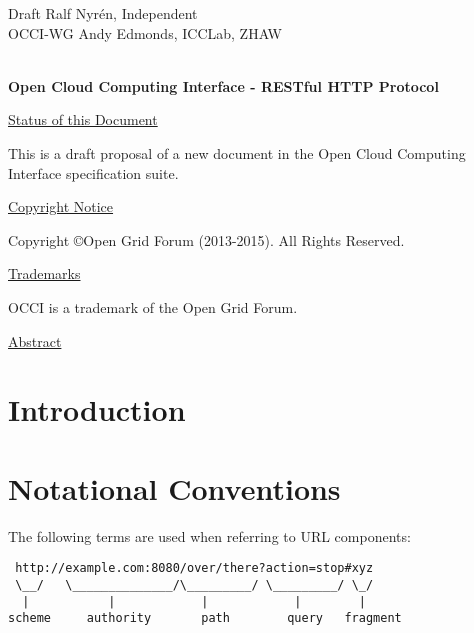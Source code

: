 \documentclass[10pt,a4paper]{article}
\begin{document}
\thispagestyle{empty}

Draft \hfill Ralf Nyrén, Independent \\
OCCI-WG \hfill Andy Edmonds, ICCLab, ZHAW \\
\\

\vspace*{0.5in}

\begin{Large}
\textbf{Open Cloud Computing Interface - RESTful HTTP Protocol}
\end{Large}

\vspace*{0.5in}

\underline{Status of this Document}

%
This is a draft proposal of a new document in the Open Cloud Computing
Interface specification suite.

\underline{Copyright Notice}

Copyright \copyright Open Grid Forum (2013-2015). All Rights Reserved.

\underline{Trademarks}

OCCI is a trademark of the Open Grid Forum.

\underline{Abstract}




\newpage
\tableofcontents
\newpage

\section{Introduction}
\label{sec:intro}


\section{Notational Conventions}
\label{sec:not_conv}


The following terms \cite{rfc3986} are used when referring to URL
components:

\begin{verbatim}
 http://example.com:8080/over/there?action=stop#xyz
 \__/   \______________/\_________/ \_________/ \_/
  |           |            |            |        |
scheme     authority       path        query   fragment
\end{verbatim}
\end{document}
